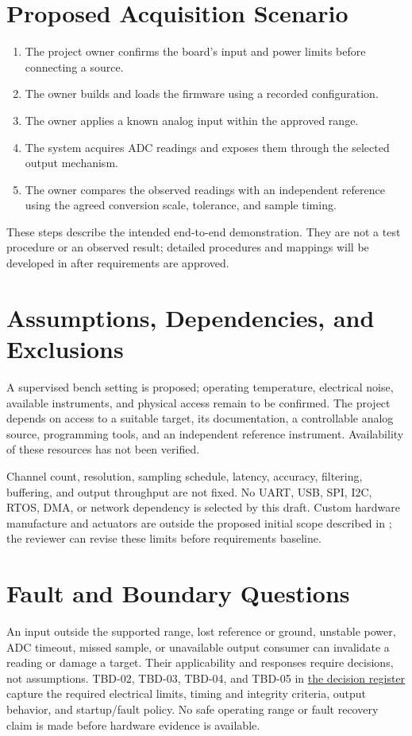 \section{Proposed Acquisition Scenario}
\begin{enumerate}
\item The project owner confirms the board's input and power limits before
connecting a source.
\item The owner builds and loads the firmware using a recorded configuration.
\item The owner applies a known analog input within the approved range.
\item The system acquires ADC readings and exposes them through the selected
output mechanism.
\item The owner compares the observed readings with an independent reference
using the agreed conversion scale, tolerance, and sample timing.
\end{enumerate}
These steps describe the intended end-to-end demonstration. They are not a
test procedure or an observed result; detailed procedures and mappings will
be developed in  after requirements are approved.

\section{Assumptions, Dependencies, and Exclusions}
A supervised bench setting is proposed; operating temperature, electrical
noise, available instruments, and physical access remain to be confirmed.
The project depends on access to a suitable target, its documentation,
a controllable analog source, programming tools, and an independent reference
instrument. Availability of these resources has not been verified.

Channel count, resolution, sampling schedule, latency, accuracy, filtering,
buffering, and output throughput are not fixed. No UART, USB, SPI, I2C,
RTOS, DMA, or network dependency is selected by this draft.
Custom hardware manufacture and actuators are outside the proposed initial
scope described in ; the reviewer can revise these
limits before requirements baseline.

\section{Fault and Boundary Questions}
An input outside the supported range, lost reference or ground, unstable power,
ADC timeout, missed sample, or unavailable output consumer can invalidate a
reading or damage a target. Their applicability and responses require decisions,
not assumptions. TBD-02, TBD-03, TBD-04, and TBD-05 in
\hyperref[Table:WeekOneTBDs]{the decision register} capture the required
electrical limits, timing and integrity criteria, output behavior, and
startup/fault policy. No safe operating range or fault recovery claim is made
before hardware evidence is available.

